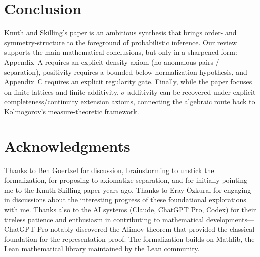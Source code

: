 \documentclass[11pt]{article}
\begin{document}
\section{Conclusion}

Knuth and Skilling’s paper is an ambitious synthesis that brings order- and symmetry-structure to the
foreground of probabilistic inference.  Our review supports the main mathematical conclusions, but only
in a sharpened form: Appendix~A requires an explicit density axiom (no anomalous pairs / separation),
positivity requires a bounded-below normalization hypothesis, and Appendix~C requires an explicit
regularity gate.
Finally, while the paper focuses on finite lattices and finite additivity, $\sigma$-additivity can be
recovered under explicit completeness/continuity extension axioms, connecting the algebraic route back
to Kolmogorov’s measure-theoretic framework.

\section*{Acknowledgments}

Thanks to Ben Goertzel for discussion, brainstorming to unstick the formalization, for proposing to axiomatize separation, and for initially pointing me to the Knuth-Skilling paper years ago.
Thanks to Eray \"Ozkural for engaging in discussions about the interesting progress of these foundational explorations with me.
Thanks also to the AI systems (Claude, ChatGPT Pro, Codex) for their tireless patience and enthusiasm in contributing to mathematical developments---ChatGPT Pro notably discovered the Alimov theorem that provided the classical foundation for the representation proof.
The formalization builds on Mathlib, the Lean mathematical library maintained by the Lean community.
\end{document}

